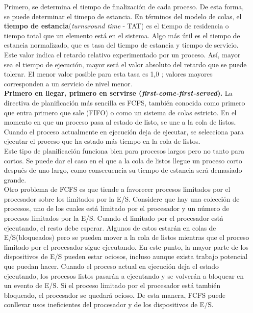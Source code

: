 \documentclass{article}
\begin{document}
				Primero, se determina el tiempo de finalización de cada proceso. De esta forma, se puede determinar el timepo de estancia. En términos del modelo de colas, el \textbf{tiempo de estancia}(\textit{turnaround time} - TAT) es el tiempo de residencia o tiempo total que un elemento está en el sistema. Algo más útil es el tiempo de estancia normalizado, que es tasa del tiempo de estancia y tiempo de servicio. Este valor indica el retardo relativo experimentado por un proceso. Así, mayor sea el tiempo de ejecución, mayor será el valor absoluto del retardo que se puede tolerar. El menor valor posible para esta tasa es 1,0 ; valores mayores corresponden a un servicio de nivel menor. \\
				
				\textbf{Primero en llegar, primero en servirse (\textit{first-come-first-served}).} La directiva de planificación más sencilla es FCFS, también conocida como primero que entra primero que sale (FIFO) o como un sistema de colas estricto. En el momento en que un proceso pasa al estado de listo, se une a la cola de listos. Cuando el proceso actualmente en ejecución deja de ejecutar, se selecciona para ejecutar el proceso que ha estado más tiempo en la cola de listos.  \\
				
				Este tipo de planificación funciona bien para procesos largos pero no tanto para cortos. Se puede dar el caso en el que a la cola de listos llegue un proceso corto después de uno largo, como consecuencia su tiempo de estancia será demasiado grande. \\
				
				Otro problema de FCFS es que tiende a favorecer procesos limitados por el procesador sobre los limitados por la E/S. Considere que hay una colección de procesos, uno de los cuales está limitado por el procesador y un número de procesos limitados por la E/S. Cuando el limitado por el procesador está ejecutando, el resto debe esperar. Algunos de estos estarán en colas de E/S(bloqueados) pero se pueden mover a la cola de listos mientras que el proceso limitado por el procesador sigue ejecutando. En este punto, la mayor parte de los dispositivos de E/S pueden estar ociosos, incluso aunque exista trabajo potencial que puedan hacer. Cuando el proceso actual en ejecución deja el estado ejecutando, los procesos listos pasarán a ejecutando y se volverán a bloquear en un evento de E/S. Si el proceso limitado por el procesador está también bloqueado, el procesador se quedará ocioso. De esta manera, FCFS puede conllevar usos ineficientes del procesador y de los dispositivos de E/S. \\
				
\end{document}
